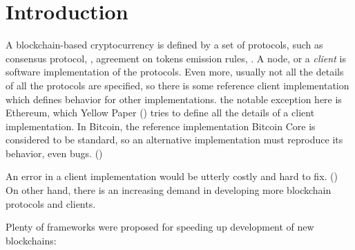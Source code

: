 
\section{Introduction}

A blockchain-based cryptocurrency is defined by a set of protocols, such as consensus protocol, , agreement on tokens emission rules, . A node, or a {\em client} is software implementation of the protocols. Even more, usually not all the details of all the protocols are specified, so there is some reference client implementation which defines behavior for other implementations. the notable exception here is Ethereum, which Yellow Paper () tries to define all the details of a client implementation. In Bitcoin, the reference implementation Bitcoin Core is considered to be standard, so an alternative implementation must reproduce its behavior, even bugs. ()

An error in a client implementation would be utterly costly and hard to fix. () On other hand, there is an increasing demand in developing more blockchain protocols and clients. 

Plenty of frameworks were proposed for speeding up development of new blockchains: 



